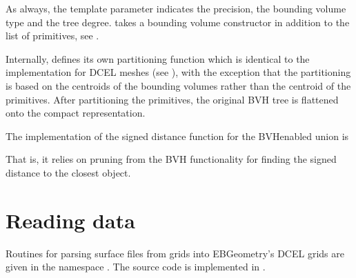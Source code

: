 \documentclass[letterpaper,10pt,english]{sphinxmanual}
\begin{document}
\sphinxAtStartPar
As always, the template parameter  indicates the precision,  the bounding volume type and  the tree degree.
 takes a bounding volume constructor in addition to the list of primitives, see {\hyperref[\detokenize{ImplemBVH:chap-bvhconstruction}]{}}.

\sphinxAtStartPar
Internally,  defines its own partitioning function which is identical to the implementation for DCEL meshes (see {\hyperref[\detokenize{ImplemDCEL:chap-bvhintegration}]{}}), with the exception that the partitioning is based on the centroids of the bounding volumes rather than the centroid of the primitives.
After partitioning the primitives, the original BVH tree is flattened onto the compact representation.

\sphinxAtStartPar
The implementation of the signed distance function for the BVH\sphinxhyphen{}enabled union is

\begin{sphinxVerbatim}[commandchars=\\\{\}]
\end{sphinxVerbatim}

\sphinxAtStartPar
That is, it relies on pruning from the BVH functionality for finding the signed distance to the closest object.

\sphinxstepscope


\section{Reading data}
\label{\detokenize{Parsers:reading-data}}\label{\detokenize{Parsers:chap-parsers}}\label{\detokenize{Parsers::doc}}
\sphinxAtStartPar
Routines for parsing surface files from grids into EBGeometry’s DCEL grids are given in the namespace .
The source code is implemented in .
\end{document}
